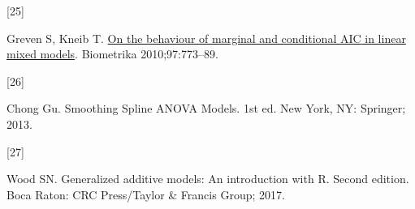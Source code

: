 \documentclass[
11pt, %
oneside, %
english, %
singlespacing, %
]{macthesis} %
\newlength{\cslhangindent}
\newlength{\csllabelwidth}
\newenvironment{CSLReferences}[2] %
{\begin{list}{}{%
	\setlength{\itemindent}{0pt}
	\setlength{\leftmargin}{0pt}
	\setlength{\parsep}{0pt}
	\ifodd #1
	\setlength{\leftmargin}{\cslhangindent}
	\setlength{\itemindent}{-1\cslhangindent}
	\fi
	\setlength{\itemsep}{#2\baselineskip}}}
{\end{list}}
\newcommand{\CSLLeftMargin}[1]{\parbox[t]{\csllabelwidth}{\strut#1\strut}}
\newcommand{\CSLRightInline}[1]{\parbox[t]{\linewidth - \csllabelwidth}{\strut#1\strut}}
\begin{document}
\begin{CSLReferences}{0}{0}
\CSLLeftMargin{{[}25{]} }%
\CSLRightInline{Greven S, Kneib T. \href{https://www.jstor.org/stable/29777136}{On the behaviour of marginal and conditional {AIC} in linear mixed models}. Biometrika 2010;97:773--89.}

\CSLLeftMargin{{[}26{]} }%
\CSLRightInline{Chong Gu. Smoothing {Spline ANOVA Models}. 1st ed. New York, NY: Springer; 2013.}

\CSLLeftMargin{{[}27{]} }%
\CSLRightInline{Wood SN. Generalized additive models: An introduction with {R}. Second edition. Boca Raton: CRC Press/Taylor \& Francis Group; 2017.}

\end{CSLReferences}
\end{document}
